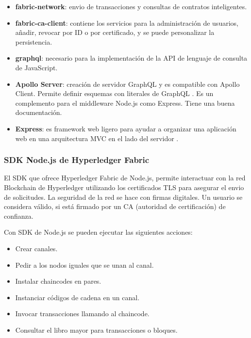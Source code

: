 \begin{itemize}
    \item \textbf{fabric-network}: envio de transacciones y consultas de contratos inteligentes.
    \item \textbf{fabric-ca-client}: contiene los servicios para la administración de usuarios, añadir, revocar por ID
    o por certificado, y se puede personalizar la persistencia.
    \item \textbf{graphql}: necesario para la implementación de la API de lenguaje de consulta de JavaScript. 
    \item \textbf{Apollo Server}: creación de servidor GraphQL y es compatible con Apollo Client. Permite definir 
    esquemas con literales de GraphQL \cite{introduction-apollo-server}. Es un complemento para el middleware Node.js 
    como Express. Tiene una buena documentación.
    \item \textbf{Express}: es framework web ligero para ayudar a organizar una aplicación web en una arquitectura MVC 
    en el lado del servidor \cite{what-is-express.js}.
\end{itemize}

\subsubsection*{SDK Node.js de Hyperledger Fabric}

\noindent El SDK que ofrece Hyperledger Fabric de Node.js, permite interactuar con la red Blockchain de Hyperledger
utilizando los certificados TLS para asegurar el envio de solicitudes. La seguridad de la red se hace con firmas
digitales. Un usuario se considera válido, si está firmado por un CA (autoridad de certificación) de confianza.

\vspace{5mm}

\noindent Con SDK de Node.js se pueden ejecutar las siguientes acciones:

\begin{itemize}
    \item Crear canales.
    \item Pedir a los nodos iguales que se unan al canal.
    \item Instalar chaincodes en pares.
    \item Instanciar códigos de cadena en un canal.
    \item Invocar transacciones llamando al chaincode.
    \item Consultar el libro mayor para transacciones o bloques.
\end{itemize}

